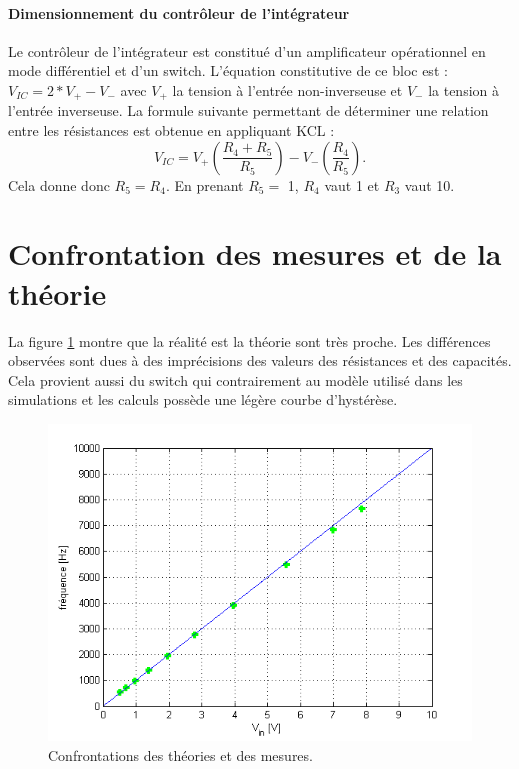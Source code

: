\paragraph{Dimensionnement du contrôleur de l'intégrateur}
Le contrôleur de l'intégrateur est constitué d'un amplificateur opérationnel 
en mode différentiel et d'un switch. L'équation constitutive de ce bloc est : 
$V_{IC}=2*V_+ - V_-$ avec $V_+$ la tension à l'entrée non-inverseuse et $V_-$
la tension à l'entrée inverseuse. La formule suivante permettant de déterminer
une relation entre les résistances est obtenue en appliquant KCL : 
\[ V_{IC}=V_+ \left(\frac{R_4 + R_5}{R_5}\right)-V_-\left(\frac{R_4}{R_5}\right). \] 
Cela donne donc $R_5 = R_4$. En prenant $R_5 =$ \unit{1}{\kilo\ohm}, $R_4$ vaut \unit{1}{\kilo\ohm}
et $R_3$ vaut \unit{10}{\kilo\ohm}.

\section{Confrontation  des mesures et de la théorie}
La figure \ref{fig:theory_vs_mesure} montre que la réalité est la théorie sont très proche.
Les différences observées sont dues à des imprécisions des valeurs des résistances et des 
capacités. Cela provient aussi du switch qui contrairement au modèle utilisé dans les 
simulations et les calculs possède une légère courbe d'hystérèse.
\begin{figure}
	\centering
	\includegraphics[scale=0.45]{img-vco/vco_vs_reality.png}
	\caption{Confrontations des théories et des mesures.}
	\label{fig:theory_vs_mesure}
\end{figure}